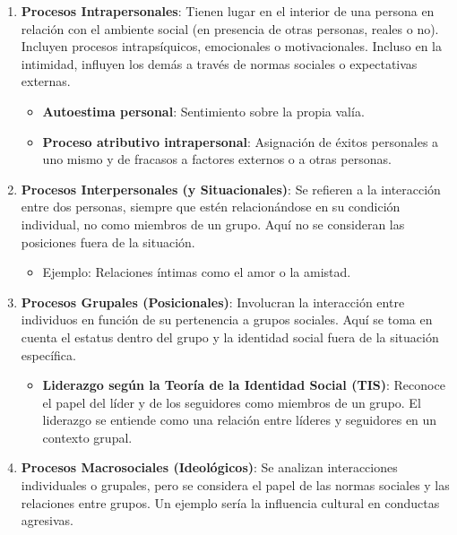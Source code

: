 \documentclass[
]{website}
\providecommand{\tightlist}{%
  \setlength{\itemsep}{0pt}\setlength{\parskip}{0pt}}
\begin{document}
\begin{enumerate}
\def\labelenumi{\arabic{enumi}.}
\tightlist
\item
  \textbf{Procesos Intrapersonales}:
  Tienen lugar en el interior de una persona en relación con el ambiente social (en presencia de otras personas, reales o no). Incluyen procesos intrapsíquicos, emocionales o motivacionales. Incluso en la intimidad, influyen los demás a través de normas sociales o expectativas externas.

  \begin{itemize}
  \tightlist
  \item
    \textbf{Autoestima personal}: Sentimiento sobre la propia valía.
  \item
    \textbf{Proceso atributivo intrapersonal}: Asignación de éxitos personales a uno mismo y de fracasos a factores externos o a otras personas.
  \end{itemize}
\item
  \textbf{Procesos Interpersonales (y Situacionales)}:
  Se refieren a la interacción entre dos personas, siempre que estén relacionándose en su condición individual, no como miembros de un grupo. Aquí no se consideran las posiciones fuera de la situación.

  \begin{itemize}
  \tightlist
  \item
    Ejemplo: Relaciones íntimas como el amor o la amistad.
  \end{itemize}
\item
  \textbf{Procesos Grupales (Posicionales)}:
  Involucran la interacción entre individuos en función de su pertenencia a grupos sociales. Aquí se toma en cuenta el estatus dentro del grupo y la identidad social fuera de la situación específica.

  \begin{itemize}
  \tightlist
  \item
    \textbf{Liderazgo según la Teoría de la Identidad Social (TIS)}: Reconoce el papel del líder y de los seguidores como miembros de un grupo. El liderazgo se entiende como una relación entre líderes y seguidores en un contexto grupal.
  \end{itemize}
\item
  \textbf{Procesos Macrosociales (Ideológicos)}:
  Se analizan interacciones individuales o grupales, pero se considera el papel de las normas sociales y las relaciones entre grupos. Un ejemplo sería la influencia cultural en conductas agresivas.
\end{enumerate}
\end{document}
